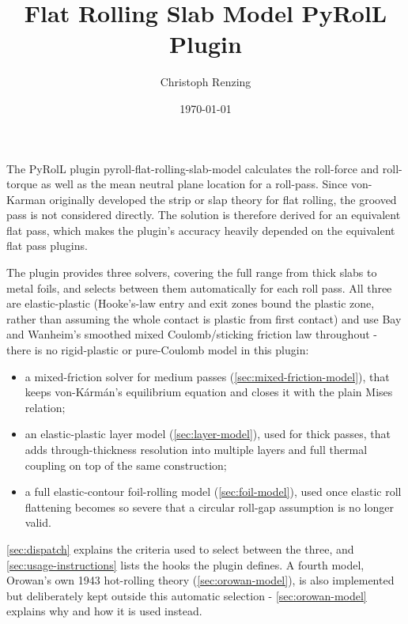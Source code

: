 \documentclass[11pt]{PyRollDocs}
\begin{document}
    \title{Flat Rolling Slab Model PyRolL Plugin}
    \author{Christoph Renzing}
    \date{\today}

    \maketitle

    The PyRolL plugin pyroll-flat-rolling-slab-model calculates the roll-force and roll-torque as well as the mean neutral plane location for a roll-pass.
    Since von-Karman originally developed the strip or slap theory for flat rolling, the grooved pass is not considered directly.
    The solution is therefore derived for an equivalent flat pass, which makes the plugin's accuracy heavily depended on the equivalent flat pass plugins.

    The plugin provides three solvers, covering the full range from thick slabs to metal foils, and selects between them automatically for each roll pass. All three are elastic-plastic (Hooke's-law entry and exit zones bound the plastic zone, rather than assuming the whole contact is plastic from first contact) and use Bay and Wanheim's smoothed mixed Coulomb/sticking friction law throughout - there is no rigid-plastic or pure-Coulomb model in this plugin:

    \begin{itemize}
        \item a mixed-friction solver for medium passes (\autoref{sec:mixed-friction-model}), that keeps von-Kármán's equilibrium equation and closes it with the plain Mises relation;
        \item an elastic-plastic layer model (\autoref{sec:layer-model}), used for thick passes, that adds through-thickness resolution into multiple layers and full thermal coupling on top of the same construction;
        \item a full elastic-contour foil-rolling model (\autoref{sec:foil-model}), used once elastic roll flattening becomes so severe that a circular roll-gap assumption is no longer valid.
    \end{itemize}

    \autoref{sec:dispatch} explains the criteria used to select between the three, and \autoref{sec:usage-instructions} lists the hooks the plugin defines. A fourth model, Orowan's own 1943 hot-rolling theory (\autoref{sec:orowan-model}), is also implemented but deliberately kept outside this automatic selection - \autoref{sec:orowan-model} explains why and how it is used instead.
\end{document}
